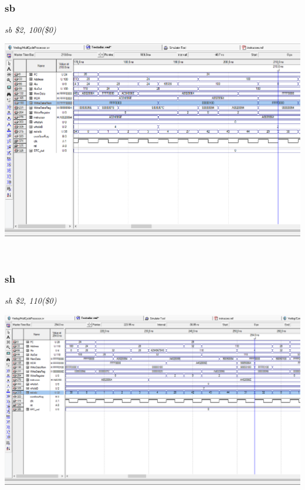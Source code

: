 \documentclass{article}
\begin{document}
    \\
    \subsubsection{sb}
    {\it sb \$2, 100(\$0)}
    \begin{center}
        \includegraphics[scale=0.25]{sb.PNG}
    \end{center}
    
    \\
    \subsubsection{sh}
    {\it sh \$2, 110(\$0)}
    \begin{center}
        \includegraphics[scale=0.25]{sh.PNG}
    \end{center}
    
    \\
\end{document}
